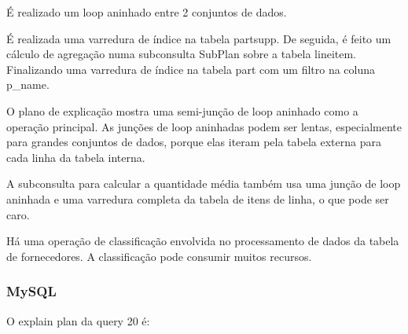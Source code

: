 \documentclass{article}
\begin{document}
  É realizado um loop aninhado entre 2 conjuntos de dados.

  É realizada uma varredura de índice na tabela partsupp. De seguida, é feito um cálculo de agregação numa subconsulta SubPlan sobre a tabela lineitem. Finalizando uma varredura de índice na tabela part com um filtro na coluna p\_name.


O plano de explicação mostra uma semi-junção de loop aninhado como a operação principal. As junções de loop aninhadas podem ser lentas, especialmente para grandes conjuntos de dados, porque elas iteram pela tabela externa para cada linha da tabela interna.

A subconsulta para calcular a quantidade média também usa uma junção de loop aninhada e uma varredura completa da tabela de itens de linha, o que pode ser caro.

Há uma operação de classificação envolvida no processamento de dados da tabela de fornecedores. A classificação pode consumir muitos recursos.

\subsubsection{MySQL}
O explain plan da query 20 é:\\
\end{document}
